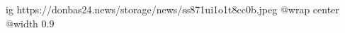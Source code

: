  
 
 
 
 

\ifcmt
  ig https://donbas24.news/storage/news/ss871ui1o1t8cc0b.jpeg
  @wrap center
  @width 0.9
\fi
